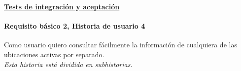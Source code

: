 \documentclass[../ei103948-project-documentation.tex]{subfiles}
\begin{document}
					\newpage

					\begin{center}
						\textbf{\underline{Tests de integración y aceptación}}
					\end{center}

					\testBasicoO

					\vspace*{5mm}

				\paragraph{Requisito básico 2, Historia de usuario 4}
					Como usuario quiero consultar fácilmente la información de cualquiera de las ubicaciones activas por separado.\\
					\textit{Esta historia está dividida en subhistorias}.
\end{document}
